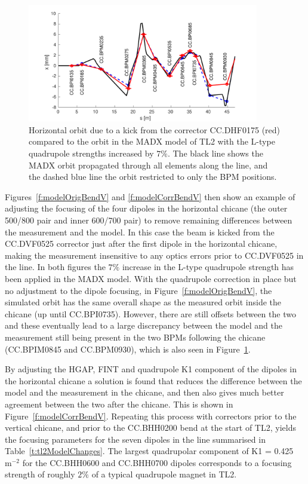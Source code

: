 \begin{figure}
  \centering
  \includegraphics[width=0.9\textwidth]{Figures/optics/modelCorrQuadH}
  \caption{Horizontal orbit due to a kick from the corrector CC.DHF0175 (red) compared to the orbit in the MADX model of TL2 with the L-type quadrupole strengths increased by \(7\%\). The black line shows the MADX orbit propagated through all elements along the line, and the dashed blue line the orbit restricted to only the BPM positions.}
  \label{f:modelCorrQuadH}
\end{figure}

Figures~\ref{f:modelOrigBendV} and \ref{f:modelCorrBendV} then show an example of adjusting the focusing of the four dipoles in the horizontal chicane (the outer 500/800 pair and inner 600/700 pair) to remove remaining differences between the measurement and the model. In this case the beam is kicked from the CC.DVF0525 corrector just after the first dipole in the horizontal chicane, making the measurement insensitive to any optics errors prior to CC.DVF0525 in the line. In both figures the \(7\%\) increase in the L-type quadrupole strength has been applied in the MADX model. With the quadrupole correction in place but no adjustment to the dipole focusing, in Figure~\ref{f:modelOrigBendV}, the simulated orbit has the same overall shape as the measured orbit inside the chicane (up until CC.BPI0735). However, there are still offsets between the two and these eventually lead to a large discrepancy between the model and the measurement still being present in the two BPMs following the chicane (CC.BPIM0845 and CC.BPM0930), which is also seen in Figure~\ref{f:modelCorrQuadH}. 

By adjusting the HGAP, FINT and quadrupole K1 component of the dipoles in the horizontal chicane a solution is found that reduces the difference between the model and the measurement in the chicane, and then also gives much better agreement between the two after the chicane. This is shown in Figure~\ref{f:modelCorrBendV}. Repeating this process with correctors prior to the vertical chicane, and prior to the CC.BHH0200 bend at the start of TL2, yields the focusing parameters for the seven dipoles in the line summarised in Table~\ref{t:tl2ModelChanges}. The largest quadrupolar component of K1 = 0.425~\(\mathrm{m^{-2}}\) for the CC.BHH0600 and CC.BHH0700 dipoles corresponds to a focusing strength of roughly \(2\%\) of a typical quadrupole magnet in TL2.

